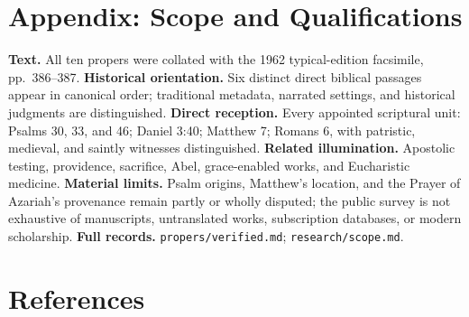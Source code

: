 \section*{Appendix: Scope and Qualifications}

\begin{studyframe}
\textbf{Text.} All ten propers were collated with the 1962 typical-edition facsimile, pp.~386--387. \textbf{Historical orientation.} Six distinct direct biblical passages appear in canonical order; traditional metadata, narrated settings, and historical judgments are distinguished. \textbf{Direct reception.} Every appointed scriptural unit: Psalms 30, 33, and 46; Daniel 3:40; Matthew 7; Romans 6, with patristic, medieval, and saintly witnesses distinguished. \textbf{Related illumination.} Apostolic testing, providence, sacrifice, Abel, grace-enabled works, and Eucharistic medicine. \textbf{Material limits.} Psalm origins, Matthew's location, and the Prayer of Azariah's provenance remain partly or wholly disputed; the public survey is not exhaustive of manuscripts, untranslated works, subscription databases, or modern scholarship. \textbf{Full records.} \nolinkurl{propers/verified.md}; \nolinkurl{research/scope.md}.
\end{studyframe}

\section*{References}

